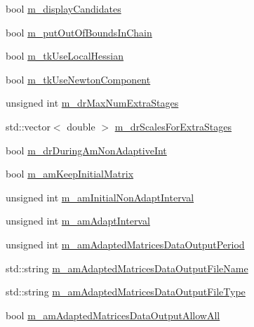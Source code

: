 \begin{DoxyCompactItemize}
\item 
bool \hyperlink{class_q_u_e_s_o_1_1_mh_options_values_a1df386cecfd87745e4d8adfb472d3443}{m\-\_\-display\-Candidates}
\item 
bool \hyperlink{class_q_u_e_s_o_1_1_mh_options_values_a6500d388ce724964ed858174a454177a}{m\-\_\-put\-Out\-Of\-Bounds\-In\-Chain}
\item 
bool \hyperlink{class_q_u_e_s_o_1_1_mh_options_values_a3fa3d465b07ea276e7b2aa68b897e4ec}{m\-\_\-tk\-Use\-Local\-Hessian}
\item 
bool \hyperlink{class_q_u_e_s_o_1_1_mh_options_values_ae4fcf242f3d9e216c17d057faf6939c3}{m\-\_\-tk\-Use\-Newton\-Component}
\item 
unsigned int \hyperlink{class_q_u_e_s_o_1_1_mh_options_values_ab72acd4e4b80dd5c3a4b361466474f21}{m\-\_\-dr\-Max\-Num\-Extra\-Stages}
\item 
std\-::vector$<$ double $>$ \hyperlink{class_q_u_e_s_o_1_1_mh_options_values_a37774da61eda0aaa92dbcc417944b2e2}{m\-\_\-dr\-Scales\-For\-Extra\-Stages}
\item 
bool \hyperlink{class_q_u_e_s_o_1_1_mh_options_values_ab546a17967c0690d0c01730f63ccb70b}{m\-\_\-dr\-During\-Am\-Non\-Adaptive\-Int}
\item 
bool \hyperlink{class_q_u_e_s_o_1_1_mh_options_values_a65b54138ec13a04d67a75a03f6300132}{m\-\_\-am\-Keep\-Initial\-Matrix}
\item 
unsigned int \hyperlink{class_q_u_e_s_o_1_1_mh_options_values_a3e72af53780ce9420c3454b00f56bc11}{m\-\_\-am\-Initial\-Non\-Adapt\-Interval}
\item 
unsigned int \hyperlink{class_q_u_e_s_o_1_1_mh_options_values_a5cda43f7f5361c56eab4c036c9bcab5d}{m\-\_\-am\-Adapt\-Interval}
\item 
unsigned int \hyperlink{class_q_u_e_s_o_1_1_mh_options_values_a9e9de50014cce9683774d42119a1b752}{m\-\_\-am\-Adapted\-Matrices\-Data\-Output\-Period}
\item 
std\-::string \hyperlink{class_q_u_e_s_o_1_1_mh_options_values_ad131a1b5617e040b7602fbd6bf4a600e}{m\-\_\-am\-Adapted\-Matrices\-Data\-Output\-File\-Name}
\item 
std\-::string \hyperlink{class_q_u_e_s_o_1_1_mh_options_values_a2aeb0e38d87c86464af4bde6a202598a}{m\-\_\-am\-Adapted\-Matrices\-Data\-Output\-File\-Type}
\item 
bool \hyperlink{class_q_u_e_s_o_1_1_mh_options_values_aa149885c0a566a853626ddae4a31f313}{m\-\_\-am\-Adapted\-Matrices\-Data\-Output\-Allow\-All}
\item 

\end{DoxyCompactItemize}
